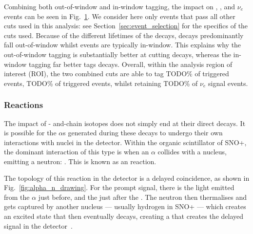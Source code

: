 Combining both out-of-window and in-window  tagging, the impact on , , and \beight{} $\nu_e$ events can be seen in Fig.~\ref{fig:bipo_tagging_efficiency}. We consider here only events that pass all other cuts used in this analysis: see Section~\ref{sec:event_selection} %
for the specifics of the cuts used. Because of the different lifetimes of the decays,  decays predominantly fall out-of-window whilst  events are typically in-window. This explains why the out-of-window tagging is substantially better at cutting  decays, whereas the in-window tagging far better tags  decays. Overall, within the analysis region of interest (ROI), the two combined cuts are able to tag TODO\% %
of  triggered events, TODO\% %
of  triggered events, whilst retaining TODO\% %
of \beight{} $\nu_e$ signal events.

\begin{figure}
    \centering
    \caption[]{}
    \label{fig:bipo_tagging_efficiency}
\end{figure}

\subsubsection{\alphan{} Reactions}\label{sec:alphans}
The impact of - and-chain isotopes does not simply end at their direct decays. It is possible for the $\alpha$s generated during these decays to undergo their own interactions with nuclei in the detector. Within the organic scintillator of SNO+, the dominant interaction of this type is when an $\alpha$ collides with a  nucleus, emitting a neutron: . This is known as an \alphan{} reaction.

The topology of this reaction in the detector is a delayed coincidence, as shown in Fig.~\ref{fig:alpha_n_drawing}. %
For the prompt signal, there is the light emitted from the $\alpha$ just before, and the  just after the \alphan{}. The neutron then thermalises and gets captured by another nucleus --- usually hydrogen in SNO+ --- which creates an excited state that then eventually decays, creating a \ce{\gamma} that creates the delayed signal in the detector~\cite{}. %

